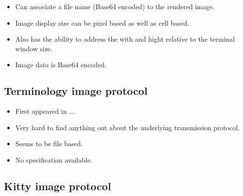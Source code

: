 \documentclass{article}
\begin{document}
\begin{itemize}
    \item Can associate a file name (Base64 encoded) to the rendered image.
    \item Image display size can be pixel based as well as cell based.
    \item Also has the ability to address the with and hight relative to the terminal window size.
    \item Image data is Base64 encoded.
\end{itemize}


\subsection{Terminology image protocol}

\begin{itemize}
    \item First appeared in ... 
    \item Very hard to find anything out about the underlying transmission protocol.
    \item Seems to be file based.
    \item No specification available.
\end{itemize}

\subsection{Kitty image protocol}
\end{document}
